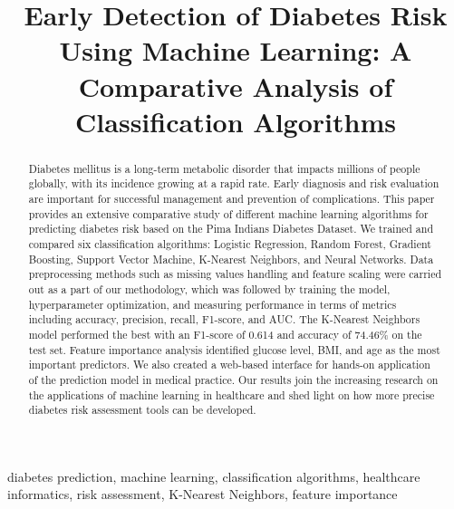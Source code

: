 \documentclass[conference]{IEEEtran}
\begin{document}
\title{Early Detection of Diabetes Risk Using Machine Learning: A Comparative Analysis of Classification Algorithms\\
}

\author{
}

\maketitle

\begin{abstract}
Diabetes mellitus is a long-term metabolic disorder that impacts millions of people globally, with its incidence growing at a rapid rate. Early diagnosis and risk evaluation are important for successful management and prevention of complications. This paper provides an extensive comparative study of different machine learning algorithms for predicting diabetes risk based on the Pima Indians Diabetes Dataset. We trained and compared six classification algorithms: Logistic Regression, Random Forest, Gradient Boosting, Support Vector Machine, K-Nearest Neighbors, and Neural Networks. Data preprocessing methods such as missing values handling and feature scaling were carried out as a part of our methodology, which was followed by training the model, hyperparameter optimization, and measuring performance in terms of metrics including accuracy, precision, recall, F1-score, and AUC. The K-Nearest Neighbors model performed the best with an F1-score of 0.614 and accuracy of 74.46\% on the test set. Feature importance analysis identified glucose level, BMI, and age as the most important predictors. We also created a web-based interface for hands-on application of the prediction model in medical practice. Our results join the increasing research on the applications of machine learning in healthcare and shed light on how more precise diabetes risk assessment tools can be developed.
\end{abstract}

\begin{IEEEkeywords}
diabetes prediction, machine learning, classification algorithms, healthcare informatics, risk assessment, K-Nearest Neighbors, feature importance
\end{IEEEkeywords}
\end{document}
